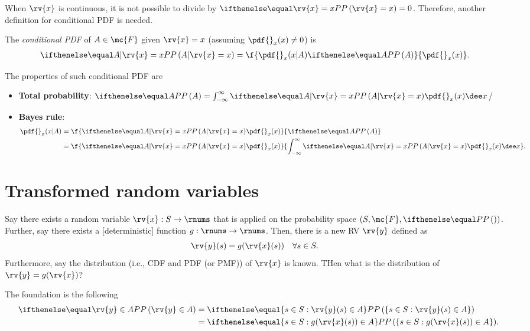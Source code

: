 When $\rv{x}$ is continuous, it is not possible to divide by $\prob{\rv{x}=x}=0$. Therefore, another definition for conditional PDF is needed.
\begin{mydefinition}
  The \emph{conditional PDF} of $A\in\mc{F}$ given $\rv{x}=x$ (assuming $\pdf{}_{x}(x)\neq0$) is
  \begin{align}
      \prob{A| \rv{x}=x} &= \f{\pdf{}_{x}(x|A)\prob{A}}{\pdf{}_{x}(x)}.
  \end{align}
\end{mydefinition}
The properties of such conditional PDF are
\begin{itemize}
    \item \textbf{Total probability}: $\prob{A}=\int_{-\infty}^{\infty} \prob{A|\rv{x}=x}\pdf{}_{x}(x)\dee x$/
    \item \textbf{Bayes rule}:
    \begin{align}
        \pdf{}_{x}(x|A) 
        &= \f{\prob{A|\rv{x}=x}\pdf{}_{x}(x)}{\prob{A}}\\
        &= \f{\prob{A|\rv{x}=x}\pdf{}_{x}(x)}{\int_{-\infty}^{\infty}\prob{A|\rv{x}=x}\pdf{}_{x}(x)\dee x}.
    \end{align}
\end{itemize}



\section{Transformed random variables}
\label{sec: SRV: Transformed random variables}
Say there exists a random variable $\rv{x}: S\to\rnums$ that is applied on the probability space $(S,\mc{F},\prob{})$. Further, say there exists a [deterministic] function $g:\rnums\to\rnums$. Then, there is a new RV $\rv{y}$ defined as 
\begin{align}
    \rv{y}(s) &= g(\rv{x}(s)) \quad\forall s\in S.
\end{align}
Furthermore, say the distribution (i.e., CDF and PDF (or PMF)) of $\rv{x}$ is known. THen what is the distribution of $\rv{y}=g(\rv{x})$?

The foundation is the following
\begin{align}
    \prob{\rv{y}\in{A}}
    &= \prob{\left\{ s\in S : \rv{y}(s)\in A\right\}}\\
    &= \prob{\left\{ s\in S : g(\rv{x}(s))\in A\right\}}.
\end{align}

